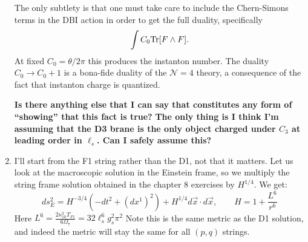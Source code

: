 \documentclass[11pt, class=article, crop=false]{standalone}
\begin{document}
\begin{enumerate}
	The only subtlety is that one must take care to include the Chern-Simons terms in the DBI action in order to get the full duality, specifically 
	\[
		\int C_0 \mathrm{Tr} [F \wedge F].
	\]
	At fixed $C_0 = \theta/2\pi$ this produces the instanton number. The duality $C_0 \to C_0 + 1$ is a bona-fide duality of the $\mathcal N=4$ theory, a consequence of the fact that instanton charge is quantized. 
	
	\textbf{Is there anything else that I can say that constitutes any form of ``showing'' that this fact is true?}
	\textbf{The only thing is I think I'm assuming that the D3 brane is the only object charged under $C_3$ at leading order in $\ell_s$. Can I safely assume this?}
	
	\item I'll start from the F1 string rather than the D1, not that it matters. Let us look at the macroscopic solution in the Einstein frame, so we multiply the string frame solution obtained in the chapter 8 exercises by $H^{1/4}$. We get:
	\[
		ds^2_E = H^{-3/4}(-dt^2 + (dx^1)^2)+ H^{1/4} d \vec x \cdot d \vec x, \qquad H = 1 + \frac{L^6}{r^6}
	\]
	Here $L^6 = \frac{2 \kappa_{10}^2 T_{F1}}{6 \Omega_7} = 32 \ell_s^6 g_s^2 \pi^2$ %
	Note this is the same metric as the D1 solution, and indeed the metric will stay the same for all $(p,q)$ strings.
	

\end{enumerate}
\end{document}
